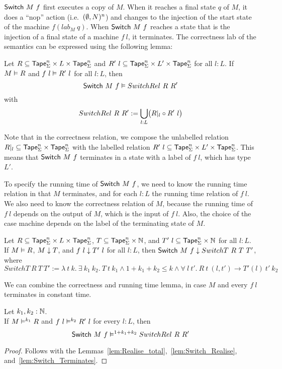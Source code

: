 $\mathsf{Switch}~M~f$ first executes a copy of $M$.  When it reaches a final state $q$ of $M$, it does a ``nop'' action (i.e.\ $(\emptyset,N)^n$) and changes
to the injection of the start state of the machine $f(lab_M~q)$.  When $\mathsf{Switch}~M~f$ reaches a state that is the injection of a final state of a
machine $f~l$, it terminates.  The correctness lab of the semantics can be expressed using the following lemma:

\begin{lemma}
  \label{lem:Switch_Realise}
  Let $R \subseteq \mathsf{Tape}_\Sigma^n \times L \times \mathsf{Tape}_\Sigma^n$ and $R'~l \subseteq \mathsf{Tape}_\Sigma^n \times L' \times \mathsf{Tape}_\Sigma^n$ for all $l:L$.
  If $M \mathrel{\vDash} R$ and $f~l \mathrel{\vDash} R'~l$ for all $l:L$, then
  \[
    \mathsf{Switch}~M~f \mathrel{\vDash} SwitchRel~R~R'
  \]
  with
  \[
    SwitchRel~R~R' := \bigcup_{l:L} \bigl( R{|}_{l} \circ R'~l \bigr)
  \]
\end{lemma}

Note that in the correctness relation, we compose the unlabelled relation $R {|}_{l} \subseteq \mathsf{Tape}_\Sigma^n \times \mathsf{Tape}_\Sigma^n$ with the labelled
relation $R'~l \subseteq \mathsf{Tape}_\Sigma^n \times L' \times \mathsf{Tape}_\Sigma^n$.  This means that $\mathsf{Switch}~M~f$ terminates in a state with a label of $f~l$,
which has type $L'$.

To specify the running time of $\mathsf{Switch}~M~f$, we need to know the running time relation in that $M$ terminates, and for each $l:L$ the running
time relation of $f~l$.  We also need to know the correctness relation of $M$, because the running time of $f~l$ depends on the output of $M$, which
is the input of $f~l$.  Also, the choice of the case machine depends on the label of the terminating state of $M$.

\begin{lemma}
  \label{lem:Switch_Terminates}
  Let $R \subseteq \mathsf{Tape}_\Sigma^n \times L \times \mathsf{Tape}_\Sigma^n$, $T \subseteq \mathsf{Tape}_\Sigma^n \times \mathbb{N}$, and
  $T'~l \subseteq \mathsf{Tape}_\Sigma^n \times \mathbb{N}$ for all $l:L$.  If $M \mathrel{\vDash} R$, $M \mathrel{\downarrow} T$, and $f~l \mathrel{\downarrow} T'~l$ for all $l:L$, then
  $\mathsf{Switch}~M~f \mathrel{\downarrow} SwitchT~R~T~T'$, where
  \[
    SwitchT~R~T~T' :=
    \lambda~t~k.~ \exists~k_1~k_2.~T~t~k_1 \land 1+k_1+k_2 \le k \land
      \forall~l~t'.~ R~t~(l,t') \rightarrow T'(l)~t'~k_2
  \]
\end{lemma}

We can combine the correctness and running time lemma, in case $M$ and every $f~l$ terminates in constant time.
\begin{lemma}
  \label{lem:Switch_RealiseIn}
  Let $k_1, k_2:\mathbb{N}$.\\
  If $M \mathrel{\vDash^{k_1}} R$ and $f~l \mathrel{\vDash^{k_2}} R'~l$ for every $l:L$, then
  \[ \mathsf{Switch}~M~f \mathrel{\vDash^{1+k_1+k_2}} SwitchRel~R~R' \]
\end{lemma}
\begin{proof}
  Follows with the Lemmas~\ref{lem:Realise_total},~\ref{lem:Switch_Realise}, and~\ref{lem:Switch_Terminates}.
\end{proof}


